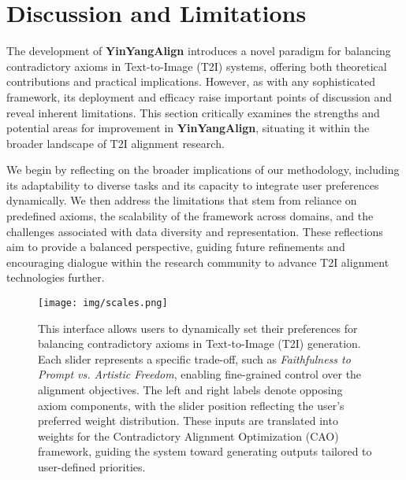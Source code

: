 

\clearpage
\newpage

\section{Discussion and Limitations} \label{sec:limitaions}

The development of \textbf{YinYangAlign} introduces a novel paradigm for balancing contradictory axioms in Text-to-Image (T2I) systems, offering both theoretical contributions and practical implications. However, as with any sophisticated framework, its deployment and efficacy raise important points of discussion and reveal inherent limitations. This section critically examines the strengths and potential areas for improvement in \textbf{YinYangAlign}, situating it within the broader landscape of T2I alignment research.

We begin by reflecting on the broader implications of our methodology, including its adaptability to diverse tasks and its capacity to integrate user preferences dynamically. We then address the limitations that stem from reliance on predefined axioms, the scalability of the framework across domains, and the challenges associated with data diversity and representation. These reflections aim to provide a balanced perspective, guiding future refinements and encouraging dialogue within the research community to advance T2I alignment technologies further.


\begin{figure}[!htb]
    \centering
    \texttt{[image: img/scales.png]}
    \caption{This interface allows users to dynamically set their preferences for balancing contradictory axioms in Text-to-Image (T2I) generation. Each slider represents a specific trade-off, such as \emph{Faithfulness to Prompt vs. Artistic Freedom}, enabling fine-grained control over the alignment objectives. The left and right labels denote opposing axiom components, with the slider position reflecting the user's preferred weight distribution. These inputs are translated into weights for the Contradictory Alignment Optimization (CAO) framework, guiding the system toward generating outputs tailored to user-defined priorities.
    }
    \label{fig:slider_selection}
\end{figure}


